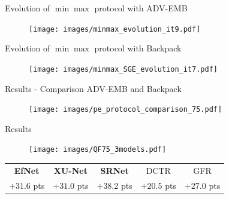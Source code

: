 \documentclass[10pt,aspectratio=169]{beamer}
\begin{document}



\begin{frame}{Evolution of $\min\max$ protocol with ADV-EMB}
   \begin{figure}
        \texttt{[image: images/minmax\_evolution\_it9.pdf]}
    \end{figure}

\end{frame}


\begin{frame}{Evolution of $\min\max$ protocol with Backpack}
    \begin{figure}
        \texttt{[image: images/minmax\_SGE\_evolution\_it7.pdf]}
    \end{figure}
\end{frame}



\begin{frame}{Results - Comparison ADV-EMB and Backpack}
    \begin{figure}[h]
        \texttt{[image: images/pe\_protocol\_comparison\_75.pdf]}
    \end{figure}
\end{frame}


\begin{frame}{Results}

    \begin{figure}[h]
        \texttt{[image: images/QF75\_3models.pdf]}
    \end{figure}
    \pause
    \begin{center}
        \begin{tabular}{ccccc}
           \textbf{EfNet} & \textbf{XU-Net} & \textbf{SRNet} & DCTR & GFR \\
           \alert{$+31.6 $ pts} & \alert{$+31.0$ pts} & \alert{$+38.2 $ pts} & $+20.5$ pts & $+27.0 $ pts
        \end{tabular}
    \end{center}
    
\end{frame}
\end{document}
